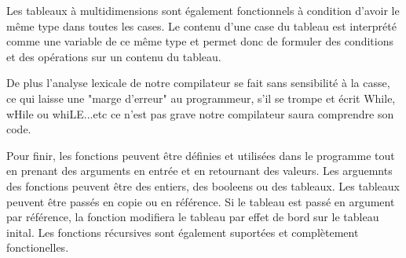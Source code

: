 \documentclass[a4paper]{article}
\begin{document}
Les tableaux à multidimensions sont également fonctionnels à condition d'avoir le même type dans toutes les cases. Le contenu d'une case du tableau est interprété comme une variable de ce même type et permet donc de formuler des conditions et des opérations sur un contenu du tableau.

De plus l'analyse lexicale de notre compilateur se fait sans sensibilité à la casse, ce qui laisse une "marge d'erreur" au programmeur, s'il se trompe et écrit While, wHile ou whiLE...etc ce n'est pas grave notre compilateur saura comprendre son code.

Pour finir, les fonctions peuvent être définies et utilisées dans le programme tout en prenant des arguments en entrée et en retournant des valeurs.
Les arguemnts des fonctions peuvent être des entiers, des booleens ou des tableaux. Les tableaux peuvent être passés en copie ou en référence. Si le tableau est passé en argument par référence, la fonction modifiera le tableau par effet de bord sur le tableau inital. Les fonctions récursives sont également suportées et complètement fonctionelles.
\end{document}
